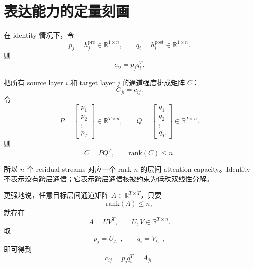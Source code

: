 \documentclass[UTF8,11pt]{ctexart}
\newcommand{\R}{\mathbb{R}}
\begin{document}
\section{表达能力的定量刻画}

在 identity 情况下，令
\begin{equation}
  p_j=h_j^{\mathrm{pre}}\in\R^{1\times n},
  \qquad
  q_i=h_i^{\mathrm{post}}\in\R^{1\times n}.
\end{equation}
则
\begin{equation}
  c_{ij}=p_jq_i^T.
\end{equation}

把所有 source layer $i$ 和 target layer $j$ 的通道强度排成矩阵 $C$：
\begin{equation}
  C_{ji}=c_{ij}.
\end{equation}
令
\begin{equation}
  P=
  \begin{bmatrix}
  p_1\\
  p_2\\
  \vdots\\
  p_T
  \end{bmatrix}
  \in\R^{T\times n},
  \qquad
  Q=
  \begin{bmatrix}
  q_1\\
  q_2\\
  \vdots\\
  q_T
  \end{bmatrix}
  \in\R^{T\times n}.
\end{equation}
则
\begin{equation}
  C=PQ^T,
  \qquad
  \mathrm{rank}(C)
  \le
  n.
\end{equation}

所以 $n$ 个 residual streams 对应一个 rank-$n$ 的层间 attention capacity。Identity 不表示没有跨层通信；它表示跨层通信核被约束为低秩双线性分解。

更强地说，任意目标层间通道矩阵 $A\in\R^{T\times T}$，只要
\begin{equation}
  \mathrm{rank}(A)\le n,
\end{equation}
就存在
\begin{equation}
  A=UV^T,
  \qquad
  U,V\in\R^{T\times n}.
\end{equation}
取
\begin{equation}
  p_j=U_{j,:},
  \qquad
  q_i=V_{i,:},
\end{equation}
即可得到
\begin{equation}
  c_{ij}=p_jq_i^T=A_{ji}.
\end{equation}
\end{document}

